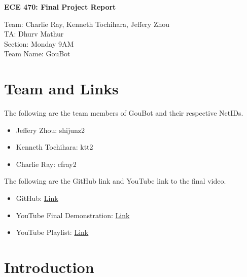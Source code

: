 
\usepackage{xurl}



\begin{center}
    \Large\textbf{ECE 470: Final Project Report}
\end{center}
\begin{flushright}
	Team: Charlie Ray, Kenneth Tochihara, Jeffery Zhou \\
	TA: Dhurv Mathur \\
	Section: Monday 9AM \\
	Team Name: GouBot
\end{flushright}

\section{Team and Links}\label{sec:introduction}
    \noindent The following are the team members of GouBot and their respective NetIDs.
    \begin{itemize} 
        \item Jeffery Zhou: shijunz2
        \item Kenneth Tochihara: ktt2
        \item Charlie Ray: cfray2
    \end{itemize}

    \noindent The following are the GitHub link and YouTube link to the final video. 
    \begin{itemize}
    \allowbreak
        \item GitHub: \href{https://github.com/ktt3/ae482_goubot}{Link}
        \item YouTube Final Demonstration: \href{https://www.youtube.com/watch?v=X16YSidoG5w&list=PLUgYn1EdVdaukTL5irfwSSML7CPnV4CY7&index=3}{Link}
        \item YouTube Playlist: \href{https://www.youtube.com/playlist?list=PLUgYn1EdVdaukTL5irfwSSML7CPnV4CY7}{Link}
    \end{itemize}

\newpage
\section{Introduction} \label{sec:intro}
    


